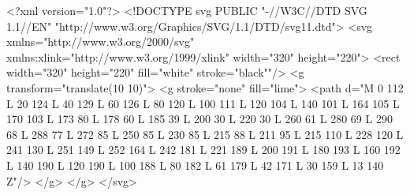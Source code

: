 <?xml version="1.0"?>
<!DOCTYPE svg PUBLIC "-//W3C//DTD SVG 1.1//EN" 
"http://www.w3.org/Graphics/SVG/1.1/DTD/svg11.dtd">
<svg xmlns="http://www.w3.org/2000/svg" 
     xmlns:xlink="http://www.w3.org/1999/xlink"
     width="320" height="220">
  <rect width="320" height="220" fill="white" stroke="black""/>
    <g transform="translate(10 10)">
      <g stroke="none" fill="lime">
        <path d="M 0 112 L 20 124 L 40 129 L 60 126 L 80 120
            L 100 111 L 120 104 L 140 101 L 164 105 L 170 103
            L 173 80 L 178 60 L 185 39 L 200 30 L 220 30
            L 260 61 L 280 69 L 290 68 L 288 77 L 272 85
            L 250 85 L 230 85 L 215 88 L 211 95 L 215 110
            L 228 120 L 241 130 L 251 149 L 252 164 L 242 181
            L 221 189 L 200 191 L 180 193 L 160 192 L 140 190
            L 120 190 L 100 188 L 80 182 L 61 179 L 42 171
            L 30 159 L 13 140 Z"/>
            </g> </g>
</svg>
